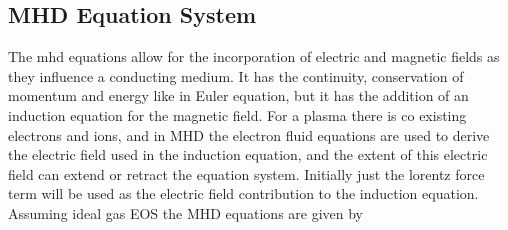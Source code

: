\documentclass[paper=a4, fontsize=11pt]{scrartcl}
\numberwithin{equation}{section}                %
\numberwithin{figure}{section}                  %
\numberwithin{table}{section}                           %
\begin{document}
\subsection{MHD Equation System}

The mhd equations allow for the incorporation of electric and magnetic fields as they influence a conducting medium. It has the continuity, conservation of momentum and energy like in Euler equation, but it has the addition of an induction equation for the magnetic field. For a plasma there is co existing electrons and ions, and in MHD the electron fluid equations are used to derive the electric field used in the induction equation, and the extent of this electric field can extend or retract the equation system. Initially just the lorentz force term will be used as the electric field contribution to the induction equation. Assuming ideal gas EOS the MHD equations are given by
\end{document}
